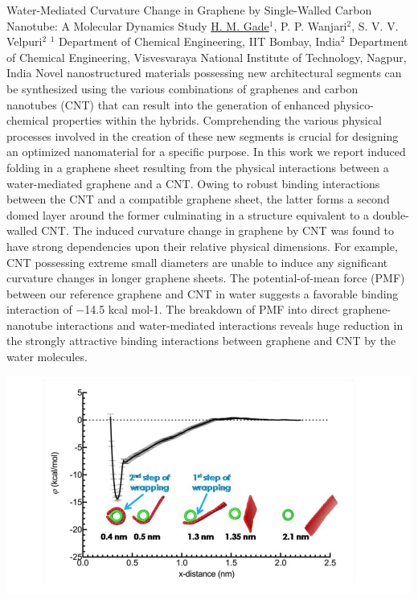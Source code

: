 
    \begin{abstract_online}{Water-Mediated Curvature Change in Graphene by Single-Walled Carbon Nanotube: A Molecular Dynamics Study}{%
        \underline{H. M. Gade}$^{1}$, P. P. Wanjari$^{2}$, S. V. V. Velpuri$^{2}$}{%
        }{%
        $^1$ Department of Chemical Engineering, IIT Bombay, India\newline{}$^2$ Department of Chemical Engineering, Visvesvaraya National Institute of Technology, Nagpur, India}
    Novel nanostructured materials possessing new architectural segments can be synthesized using the various combinations of graphenes and carbon nanotubes (CNT) that can result into the generation of enhanced physico-chemical properties within the hybrids. Comprehending the various physical processes involved in the creation of these new segments is crucial for designing an optimized nanomaterial for a specific purpose. In this work we report induced folding in a graphene sheet resulting from the physical interactions between a water-mediated graphene and a CNT. Owing to robust binding interactions between the CNT and a compatible graphene sheet, the latter forms a second domed layer around the former culminating in a structure equivalent to a double-walled CNT. The induced curvature change in graphene by CNT was found to have strong dependencies upon their relative physical dimensions. For example, CNT possessing extreme small diameters are unable to induce any significant curvature changes in longer graphene sheets. The potential-of-mean force (PMF) between our reference graphene and CNT in water suggests a favorable binding interaction of −14.5 kcal mol-1. The breakdown of PMF into direct graphene-nanotube interactions and water-mediated interactions reveals huge reduction in the strongly attractive binding interactions between graphene and CNT by the water molecules. \begin{center}  \includegraphics[width=0.8\linewidth]{abstracts/txt/figures/hrushi.png}  \caption{Potential-of-mean force for pulling center of mass of graphene from the bulk water on the outer surface of CNT along the x-axis.}  \end{center}  
    

\end{abstract_online}
